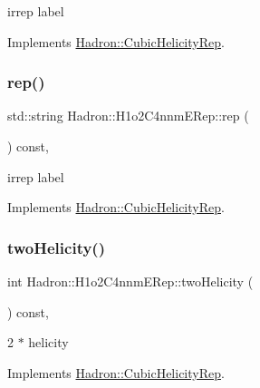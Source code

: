 irrep label 

Implements \mbox{\hyperlink{structHadron_1_1CubicHelicityRep_a8cdd86f068a167dc96faef02bfb8a33d}{Hadron\+::\+Cubic\+Helicity\+Rep}}.

\mbox{\label{structHadron_1_1H1o2C4nnmERep_aa142fe62212d47d4993ca54c3f3ab655}} 
\subsubsection{\texorpdfstring{rep()}{rep()}\hspace{0.1cm}{\footnotesize\ttfamily [3/3]}}
{\footnotesize\ttfamily std\+::string Hadron\+::\+H1o2\+C4nnm\+E\+Rep\+::rep (\begin{DoxyParamCaption}{ }\end{DoxyParamCaption}) const\hspace{0.3cm}{\ttfamily [inline]}, {\ttfamily [virtual]}}

irrep label 

Implements \mbox{\hyperlink{structHadron_1_1CubicHelicityRep_a8cdd86f068a167dc96faef02bfb8a33d}{Hadron\+::\+Cubic\+Helicity\+Rep}}.

\mbox{\label{structHadron_1_1H1o2C4nnmERep_ac93d65bb6c3d39b21cc3954eb7b92331}} 
\subsubsection{\texorpdfstring{twoHelicity()}{twoHelicity()}\hspace{0.1cm}{\footnotesize\ttfamily [1/3]}}
{\footnotesize\ttfamily int Hadron\+::\+H1o2\+C4nnm\+E\+Rep\+::two\+Helicity (\begin{DoxyParamCaption}{ }\end{DoxyParamCaption}) const\hspace{0.3cm}{\ttfamily [inline]}, {\ttfamily [virtual]}}

2 $\ast$ helicity 

Implements \mbox{\hyperlink{structHadron_1_1CubicHelicityRep_af507aa56fc2747eacc8cb6c96db31ecc}{Hadron\+::\+Cubic\+Helicity\+Rep}}.

\mbox{\label{structHadron_1_1H1o2C4nnmERep_ac93d65bb6c3d39b21cc3954eb7b92331}} 
